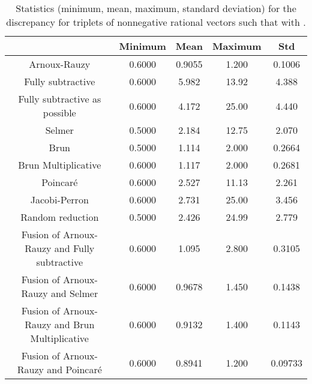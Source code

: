 \documentclass[preliminary,copyright,creativecommons]{eptcs}
\begin{document}
\begin{table}[h]
\begin{tabular}{c|c|c|c|c}
 & Minimum & Mean & Maximum & Std \\ 
\hline
Arnoux-Rauzy & 0.6000 & 0.9055 & 1.200 & 0.1006 \\ 
\hline
Fully subtractive & 0.6000 & 5.982 & 13.92 & 4.388 \\ 
\hline
Fully subtractive as possible & 0.6000 & 4.172 & 25.00 & 4.440 \\ 
\hline
Selmer & 0.5000 & 2.184 & 12.75 & 2.070 \\ 
\hline
Brun & 0.5000 & 1.114 & 2.000 & 0.2664 \\ 
\hline
Brun Multiplicative & 0.6000 & 1.117 & 2.000 & 0.2681 \\ 
\hline
Poincar\'e & 0.6000 & 2.527 & 11.13 & 2.261 \\ 
\hline
Jacobi-Perron & 0.6000 & 2.731 & 25.00 & 3.456 \\ 
\hline
Random reduction & 0.5000 & 2.426 & 24.99 & 2.779 \\ 
\hline
Fusion of Arnoux-Rauzy and Fully subtractive & 0.6000 & 1.095 & 2.800 & 0.3105 \\ 
\hline
Fusion of Arnoux-Rauzy and Selmer & 0.6000 & 0.9678 & 1.450 & 0.1438 \\ 
\hline
Fusion of Arnoux-Rauzy and Brun Multiplicative & 0.6000 & 0.9132 & 1.400 & 0.1143 \\ 
\hline
Fusion of Arnoux-Rauzy and Poincar\'e & 0.6000 & 0.8941 & 1.200 & 0.09733 \\ 
\end{tabular}
 \caption{Statistics (minimum, mean, maximum, standard deviation) for  the  discrepancy    for triplets of  nonnegative rational  vectors    such that  with  .}
\label{table_tijdeman}
\end{table}
\end{document}
